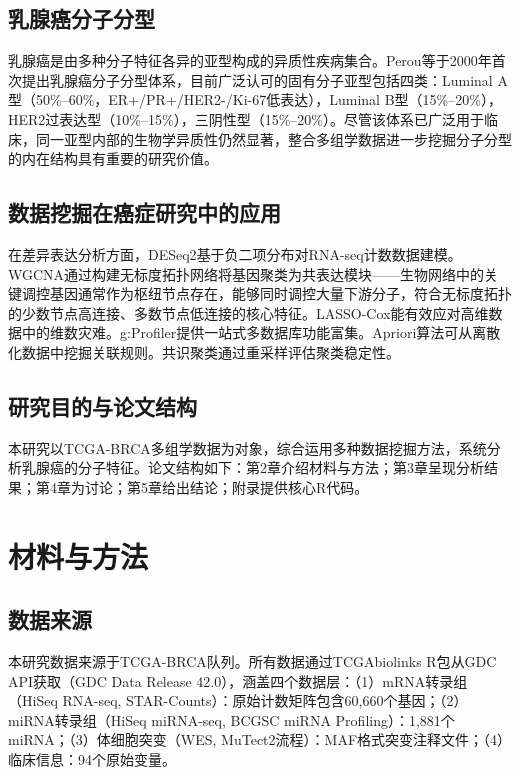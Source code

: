 \documentclass[12pt,a4paper]{ctexart}
\begin{document}
\subsection{乳腺癌分子分型}
乳腺癌是由多种分子特征各异的亚型构成的异质性疾病集合。Perou等\cite{perou2000molecular}于2000年首次提出乳腺癌分子分型体系，目前广泛认可的固有分子亚型包括四类：Luminal A型（50\%--60\%，ER+/PR+/HER2-/Ki-67低表达），Luminal B型（15\%--20\%），HER2过表达型（10\%--15\%），三阴性型（15\%--20\%）。尽管该体系已广泛用于临床，同一亚型内部的生物学异质性仍然显著，整合多组学数据进一步挖掘分子分型的内在结构具有重要的研究价值。

\subsection{数据挖掘在癌症研究中的应用}
在差异表达分析方面，DESeq2\cite{love2014moderated}基于负二项分布对RNA-seq计数数据建模。WGCNA\cite{langfelder2008wgcna}通过构建无标度拓扑网络将基因聚类为共表达模块——生物网络中的关键调控基因通常作为枢纽节点存在，能够同时调控大量下游分子，符合无标度拓扑的少数节点高连接、多数节点低连接的核心特征。LASSO-Cox\cite{simon2011regularization}能有效应对高维数据中的维数灾难。g:Profiler\cite{kolberg2023gprofiler}提供一站式多数据库功能富集。Apriori算法\cite{agrawal1994fast}可从离散化数据中挖掘关联规则。共识聚类\cite{wilkerson2010consensus}通过重采样评估聚类稳定性。

\subsection{研究目的与论文结构}
本研究以TCGA-BRCA多组学数据为对象，综合运用多种数据挖掘方法，系统分析乳腺癌的分子特征。论文结构如下：第2章介绍材料与方法；第3章呈现分析结果；第4章为讨论；第5章给出结论；附录提供核心R代码。

\section{材料与方法}

\subsection{数据来源}
本研究数据来源于TCGA-BRCA队列。所有数据通过TCGAbiolinks R包\cite{colaprico2016tcgabiolinks}从GDC API获取（GDC Data Release 42.0），涵盖四个数据层：（1）mRNA转录组（HiSeq RNA-seq, STAR-Counts）：原始计数矩阵包含60,660个基因；（2）miRNA转录组（HiSeq miRNA-seq, BCGSC miRNA Profiling）：1,881个miRNA；（3）体细胞突变（WES, MuTect2流程）：MAF格式突变注释文件；（4）临床信息：94个原始变量。
\end{document}
